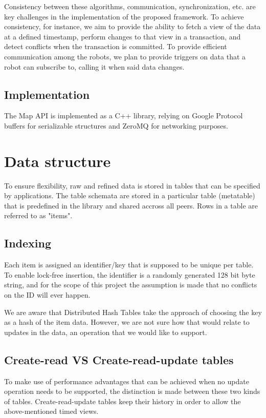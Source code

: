 \documentclass[a4paper, 10pt, conference]{ieeeconf}
\begin{document}
Consistency between these algorithms, communication, synchronization, etc. are
key challenges in the implementation of the proposed framework. To achieve
consistency, for instance, we aim to provide the ability to fetch a view of the
data at a defined timestamp, perform changes to that view in a transaction, and
detect conflicts when the transaction is committed. To provide efficient
communication among the robots, we plan to provide triggers on data that a
robot can subscribe to, calling it when said data changes.

\subsection{Implementation}

The Map API is implemented as a C++ library, relying on Google Protocol buffers
for serializable structures and ZeroMQ for networking purposes.

\section{Data structure}

To ensure flexibility, raw and refined data is stored in tables that can be 
specified by applications. The table schemata are stored in a particular table 
(metatable) that is predefined in the library and shared accross all peers. Rows
in a table are referred to as "items".

\subsection{Indexing}

Each item is assigned an identifier/key that is supposed to be unique per table.
To enable lock-free insertion, the identifier is a randomly generated 128 bit 
byte string, and for the scope of this project the assumption is made that no
conflicts on the ID will ever happen.

We are aware that Distributed Hash Tables take the approach of choosing the key
as a hash of the item data. However, we are not sure how that would relate to
updates in the data, an operation that we would like to support.

\subsection{Create-read VS Create-read-update tables}

To make use of performance advantages that can be achieved when no update
operation needs to be supported, the distinction is made between these two
kinds of tables. Create-read-update tables keep their history in order to
allow the above-mentioned timed views.
\end{document}

